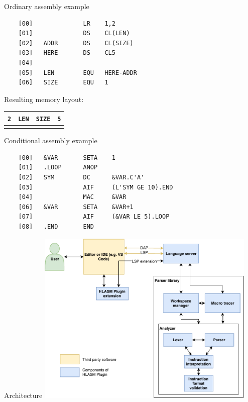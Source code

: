 \documentclass[10pt]{beamer}
\begin{document}
\begin{frame}[fragile]{Ordinary assembly example}
  
	\begin{verbatim}
	[00]              LR    1,2
	[01]              DS    CL(LEN)
	[02]   ADDR       DS    CL(SIZE)
	[03]   HERE       DS    CL5
	[04]
	[05]   LEN        EQU   HERE-ADDR
	[06]   SIZE       EQU   1
	\end{verbatim}
	
	Resulting memory layout:
	
	\begin{table}[]
		\begin{tabular}{clll}
			
			\multicolumn{1}{|p{0.5cm}|}{\centering\texttt{2}} & \multicolumn{1}{p{2cm}|}{\centering\texttt{LEN}} & \multicolumn{1}{p{3cm}|}{\centering\texttt{SIZE}} & \multicolumn{1}{p{1.5cm}|}{\centering\texttt{5}}  \\ \hline
			 &   & \multicolumn{1}{l}{\hspace{-10pt}\rotatebox{90}{\texttt{ADDR->} }}  & \multicolumn{1}{l}{\hspace{-10pt}\rotatebox{90}{\texttt{HERE->}}}                       
		\end{tabular}
	\end{table}
	
\end{frame}

\begin{frame}[fragile]{Conditional assembly example}


\begin{verbatim}
	[00]   &VAR       SETA    1
	[01]   .LOOP      ANOP         
	[02]   SYM        DC      &VAR.C'A'
	[03]              AIF     (L'SYM GE 10).END
	[04]              MAC     &VAR
	[06]   &VAR       SETA    &VAR+1
	[07]              AIF     (&VAR LE 5).LOOP
	[08]   .END       END     
\end{verbatim}


\end{frame}

\begin{frame}[fragile]{Architecture}
\centering
\includegraphics[width=10.5cm]{img/hlasm_architecture}

\end{frame}
\end{document}

